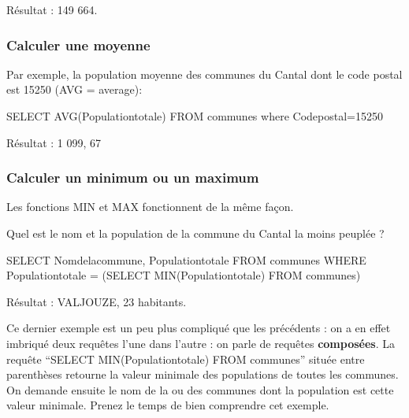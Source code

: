 \documentclass[
  a4paper,
  DIV=11,
  numbers=noendperiod]{scrartcl}
\newenvironment{Shaded}{\begin{snugshade}}{\end{snugshade}}
\newcommand{\DecValTok}[1]{\textcolor[rgb]{0.68,0.00,0.00}{#1}}
\newcommand{\FunctionTok}[1]{\textcolor[rgb]{0.28,0.35,0.67}{#1}}
\newcommand{\KeywordTok}[1]{\textcolor[rgb]{0.00,0.23,0.31}{#1}}
\newcommand{\NormalTok}[1]{\textcolor[rgb]{0.00,0.23,0.31}{#1}}
\newcommand{\OperatorTok}[1]{\textcolor[rgb]{0.37,0.37,0.37}{#1}}
\begin{document}
Résultat : 149 664.

\hypertarget{calculer-une-moyenne}{%
\subsubsection{Calculer une moyenne}\label{calculer-une-moyenne}}

Par exemple, la population moyenne des communes du Cantal dont le code
postal est 15250 (AVG = average):

\begin{Shaded}
\begin{Highlighting}[]
\KeywordTok{SELECT} \FunctionTok{AVG}\NormalTok{(Populationtotale)}
\KeywordTok{FROM}\NormalTok{ communes}
\KeywordTok{where}\NormalTok{ Codepostal}\OperatorTok{=}\DecValTok{15250}
\end{Highlighting}
\end{Shaded}

Résultat : 1 099, 67

\hypertarget{calculer-un-minimum-ou-un-maximum}{%
\subsubsection{Calculer un minimum ou un
maximum}\label{calculer-un-minimum-ou-un-maximum}}

Les fonctions MIN et MAX fonctionnent de la même façon.

Quel est le nom et la population de la commune du Cantal la moins
peuplée ?

\begin{Shaded}
\begin{Highlighting}[]
\KeywordTok{SELECT}\NormalTok{ Nomdelacommune, Populationtotale}
\KeywordTok{FROM}\NormalTok{ communes}
\KeywordTok{WHERE}\NormalTok{ Populationtotale }\OperatorTok{=}\NormalTok{ (}\KeywordTok{SELECT} \FunctionTok{MIN}\NormalTok{(Populationtotale) }\KeywordTok{FROM}\NormalTok{ communes)}
\end{Highlighting}
\end{Shaded}

Résultat : VALJOUZE, 23 habitants.

\begin{tcolorbox}[enhanced jigsaw, toprule=.15mm, bottomtitle=1mm, toptitle=1mm, left=2mm, colback=white, leftrule=.75mm, arc=.35mm, coltitle=black, bottomrule=.15mm, breakable, colbacktitle=quarto-callout-note-color!10!white, title=\textcolor{quarto-callout-note-color}{\faInfo}\hspace{0.5em}{Remarque}, titlerule=0mm, opacitybacktitle=0.6, rightrule=.15mm, opacityback=0]

Ce dernier exemple est un peu plus compliqué que les précédents : on a
en effet imbriqué deux requêtes l'une dans l'autre : on parle de
requêtes \textbf{composées}. La requête ``SELECT MIN(Populationtotale)
FROM communes'' située entre parenthèses retourne la valeur minimale des
populations de toutes les communes. On demande ensuite le nom de la ou
des communes dont la population est cette valeur minimale. Prenez le
temps de bien comprendre cet exemple.

\end{tcolorbox}
\end{document}
